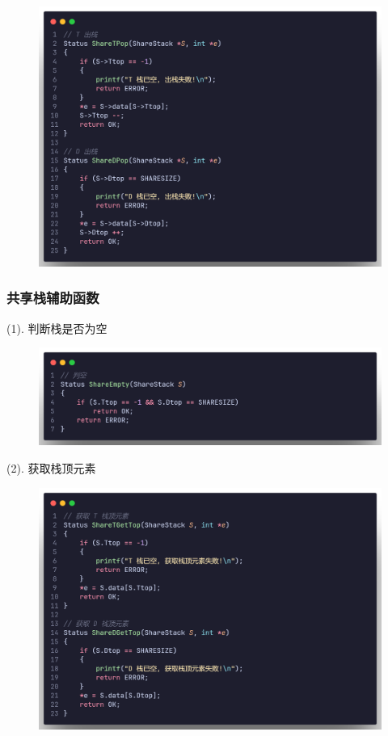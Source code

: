 \begin{figure}[H]
    \centering
    \includegraphics[scale=0.2]{"figure/Note/Stack/SSPop.png"}
\end{figure}

\subsubsection{共享栈辅助函数}

(1). 判断栈是否为空

\begin{figure}[H]
    \centering
    \includegraphics[scale=0.2]{"figure/Note/Stack/SSEmpty.png"}
\end{figure}

(2). 获取栈顶元素

\begin{figure}[H]
    \centering
    \includegraphics[scale=0.2]{"figure/Note/Stack/SSG.png"}
\end{figure}

